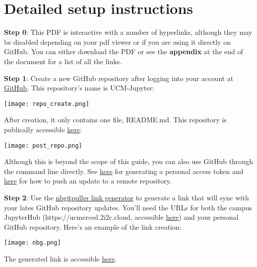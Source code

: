 \documentclass{amsart}
\begin{document}
\section*{Detailed setup instructions}

\textbf{Step 0}: This PDF is interactive with a number of hyperlinks, although they may be disabled depending on your pdf viewer or if you are using it directly on GitHub. You can either download the PDF or see the \textbf{appendix} at the end of the document for a list of all the links.

\vspace{.5in}

\textbf{Step 1}: Create a new GitHub repository after logging into your account at \href{https://www.github.com}{GitHub}. This repository's name is UCM-Jupyter:
\begin{center}
\texttt{[image: repo\_create.png]}
\end{center}
After creation, it only contains one file, README.md. This repository is publically accessible \href{https://github.com/rosemariebongers/UCM-Jupyter}{here}:
\begin{center}
\texttt{[image: post\_repo.png]}
\end{center}
Although this is beyond the scope of this guide, you can also use GitHub through the command line directly. See \href{https://docs.github.com/en/authentication/keeping-your-account-and-data-secure/managing-your-personal-access-tokens}{here} for generating a personal access token and \href{https://docs.github.com/en/get-started/using-git/pushing-commits-to-a-remote-repository}{here} for how to push an update to a remote repository.

\newpage

\textbf{Step 2}: Use the \href{https://nbgitpuller.readthedocs.io/en/latest/link.html}{nbgitpuller link generator} to generate a link that will sync with your lates GitHub repository updates. You'll need the URLs for both the campus JupyterHub (https://ucmerced.2i2c.cloud, accessible \href{https://ucmerced.2i2c.cloud}{here}) and your personal GitHub repository. Here's an example of the link creation:
\begin{center}
\texttt{[image: nbg.png]}
\end{center}
The generated link is accessible \href{https://ucmerced.2i2c.cloud/hub/user-redirect/git-pull?repo=https\%3A\%2F\%2Fgithub.com\%2Frosemariebongers\%2FUCM-Jupyter\&urlpath=tree\%2FUCM-Jupyter\%2F\&branch=main}{here}.
\end{document}
